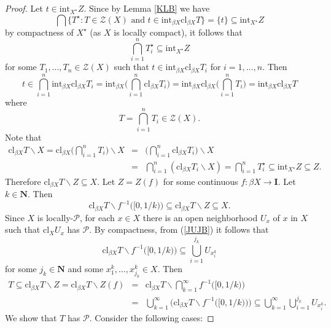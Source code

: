 \documentclass{amsart}
\theoremstyle{definition}
\theoremstyle{remark}
\theoremstyle{notation}
\numberwithin{equation}{section}
\begin{document}
\begin{proof}
Let $t\in \mbox{int}_{X^\star}Z$. Since by Lemma  \ref{KLB} we have
\[\bigcap\big\{T^\star:T\in {\mathscr Z}(X)\mbox{ and }t\in\mbox{int}_{\beta X}\mbox{cl}_{\beta X}T\big\}=\{t\}\subseteq\mbox{int}_{X^\star}Z\]
by compactness of $X^\star$ (as  $X$ is locally compact),  it follows that
\[\bigcap_{i=1}^n T^\star_i\subseteq\mbox{int}_{X^\star}Z\]
for some  $T_1,\ldots,T_n\in {\mathscr Z}(X)$ such that $t\in \mbox{int}_{\beta X}\mbox{cl}_{\beta X}T_i$ for $i=1,\ldots,n$.
Then
\begin{equation}\label{KJUJB}
t\in \bigcap_{i=1}^n\mbox{int}_{\beta X}\mbox{cl}_{\beta X}T_i=\mbox{int}_{\beta X}\Big(\bigcap_{i=1}^n\mbox{cl}_{\beta X}T_i\Big)=\mbox{int}_{\beta X}\mbox{cl}_{\beta X}\Big(\bigcap_{i=1}^nT_i\Big)=\mbox{int}_{\beta X}\mbox{cl}_{\beta X}T
\end{equation}
where
\[T=\bigcap_{i=1}^n T_i\in {\mathscr Z}(X).\]
Note that
\begin{eqnarray*}
\mbox{cl}_{\beta X}T\backslash X=\mbox{cl}_{\beta X}\Big(\bigcap_{i=1}^nT_i\Big)\backslash X&=&\Big(\bigcap_{i=1}^n\mbox{cl}_{\beta X}T_i\Big)\backslash X\\&=&\bigcap_{i=1}^n(\mbox{cl}_{\beta X}T_i\backslash X)=\bigcap_{i=1}^nT^\star_i\subseteq\mbox{int}_{X^\star}Z\subseteq Z.
\end{eqnarray*}
Therefore $\mbox{cl}_{\beta X}T\backslash Z\subseteq X$. Let $Z=Z(f)$ for some continuous $f:\beta X\rightarrow\mathbf{I}$. Let $k\in \mathbf{N}$. Then
\begin{equation}\label{JUJB}
\mbox{cl}_{\beta X}T\backslash f^{-1}\big([0,1/k)\big)\subseteq \mbox{cl}_{\beta X}T\backslash Z \subseteq X.
\end{equation}
Since $X$ is  locally-${\mathcal P}$, for each $x\in X$ there is an open neighborhood $U_x$ of $x$ in $X$ such that $\mbox{cl}_X U_x$
has ${\mathcal P}$. By compactness, from (\ref{JUJB}) it follows that
\[\mbox{cl}_{\beta X}T\backslash f^{-1}\big([0,1/k)\big)\subseteq \bigcup_{i=1}^{j_k}U_{x_i^k}\]
for some $j_k\in \mathbf{N}$ and some $x^k_1,\ldots,x^k_{j_k}\in X$. Then
\begin{eqnarray*}
T\subseteq\mbox{cl}_{\beta X}T\backslash Z=\mbox{cl}_{\beta X}T\backslash Z(f)&=&\mbox{cl}_{\beta X}T\backslash \bigcap_{k=1}^{\infty}f^{-1}\big([0,1/k)\big)\\&=&\bigcup_{k=1}^{\infty}\big(\mbox{cl}_{\beta X}T\backslash f^{-1}\big([0,1/k)\big)\big)\subseteq\bigcup_{k=1}^{\infty}\bigcup_{i=1}^{j_k}U_{x_i^k}.
\end{eqnarray*}
We show that  $T$  has ${\mathcal P}$. Consider the following cases:


\end{proof}
\end{document}
